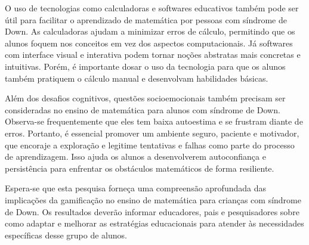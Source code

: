 O uso de tecnologias como calculadoras e softwares educativos também pode ser útil para facilitar o aprendizado de matemática por pessoas com síndrome de Down. As calculadoras ajudam a minimizar erros de cálculo, permitindo que os alunos foquem nos conceitos em vez dos aspectos computacionais. Já softwares com interface visual e interativa podem tornar noções abstratas mais concretas e intuitivas. Porém, é importante dosar o uso da tecnologia para que os alunos também pratiquem o cálculo manual e desenvolvam habilidades básicas.

Além dos desafios cognitivos, questões socioemocionais também precisam ser consideradas no ensino de matemática para alunos com síndrome de Down. Observa-se frequentemente que eles tem baixa autoestima e se frustram diante de erros. Portanto, é essencial promover um ambiente seguro, paciente e motivador, que encoraje a exploração e legitime tentativas e falhas como parte do processo de aprendizagem. Isso ajuda os alunos a desenvolverem autoconfiança e persistência para enfrentar os obstáculos matemáticos de forma resiliente.

Espera-se que esta pesquisa forneça uma compreensão aprofundada das implicações da gamificação no ensino de matemática para crianças com síndrome de Down. Os resultados deverão informar educadores, pais e pesquisadores sobre como adaptar e melhorar as estratégias educacionais para atender às necessidades específicas desse grupo de alunos.







